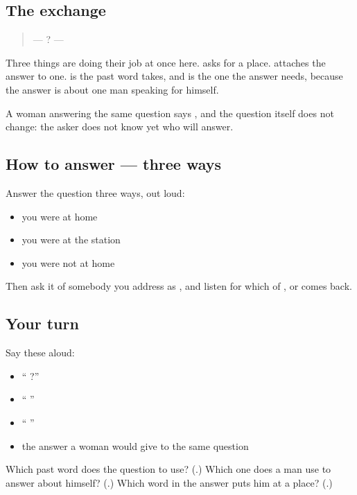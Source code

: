 \subsection*{The exchange}
\begin{quote}
—   ? —    
\end{quote}

Three things are doing their job at once here. \textbf{} asks for a place. \textbf{} attaches the answer to one. \textbf{} is the past word  takes, and \textbf{} is the one the answer needs, because the answer is about one man speaking for himself.

A woman answering the same question says \textbf{   }, and the question itself does not change: the asker does not know yet who will answer.

\subsection*{How to answer — three ways}
Answer the question three ways, out loud:

\begin{itemize}
\raggedright
  \item you were at home
  \item you were at the station
  \item you were not at home
\end{itemize}

Then ask it of somebody you address as , and listen for which of ,  or  comes back.

\subsection*{Your turn}
Say these aloud:

\begin{itemize}
\raggedright
  \item \textquotedblleft{}  ?\textquotedblright{}
  \item \textquotedblleft{}   \textquotedblright{}
  \item \textquotedblleft{}    \textquotedblright{}
  \item the answer a woman would give to the same question
\end{itemize}

\begin{tcolorbox}[breakable,colback=teal!4,colframe=teal!35!black,title={Before you move on}]
Which past word does the question to  use? (\textbf{}.) Which one does a man use to answer about himself? (\textbf{}.) Which word in the answer puts him at a place? (\textbf{}.)
\end{tcolorbox}
